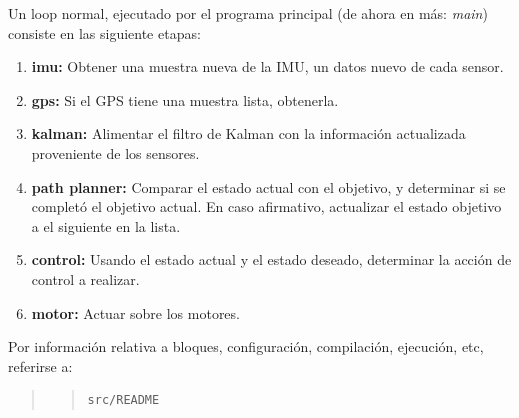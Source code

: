 \documentclass[main]{subfiles}
\begin{document}
Un loop normal, ejecutado por el programa principal (de ahora en más: \textit{main}) consiste en las siguiente etapas:
\begin{enumerate}
\item \textbf{imu:} Obtener una muestra nueva de la IMU, un datos nuevo de cada sensor.
\item \textbf{gps:} Si el GPS tiene una muestra lista, obtenerla.
\item \textbf{kalman:} Alimentar el filtro de Kalman con la información actualizada proveniente de los sensores.
\item \textbf{path planner:} Comparar el estado actual con el objetivo, y determinar si se completó el objetivo actual. En caso afirmativo, actualizar el estado objetivo a el siguiente en la lista.
\item \textbf{control:} Usando el estado actual y el estado deseado, determinar la acción de control a realizar.
\item \textbf{motor:} Actuar sobre los motores.
\end{enumerate}

Por información relativa a bloques, configuración, compilación, ejecución, etc, referirse a:
\begin{quote}
\begin{quote}
\begin{verbatim}
src/README
\end{verbatim}
\end{quote}
\end{quote}


\end{document}
